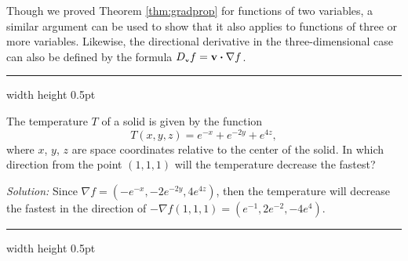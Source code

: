 Though we proved Theorem \ref{thm:gradprop} for functions of two variables, a similar argument can be used to show
that it also applies to functions of three or more variables. Likewise, the directional derivative in the
three-dimensional case can also be defined by the formula $D_{\scriptscriptstyle \textbf{v}}f =
\textbf{v} \bm{\cdot} \nabla f$.

\medskip
\hrule width \textwidth height 0.5pt
\begin{exmp}
 The temperature $T$ of a solid is given by the function 
 \[T(x,y,z) = e^{-x} + e^{-2y} + e^{4z},\] 
 where
 $x$, $y$, $z$ are space coordinates relative to the center of the solid. In which direction from the point $(1,1,1)$
 will the temperature decrease the fastest?\smallskip
 \par\noindent\emph{Solution:} Since $\nabla f = (-e^{-x},-2e^{-2y},4e^{4z})$, then the temperature will decrease the
 fastest in the direction of
 $-\nabla f(1,1,1) = (e^{-1},2e^{-2},-4e^4 )$.
\end{exmp}
\hrule width \textwidth height 0.5pt

